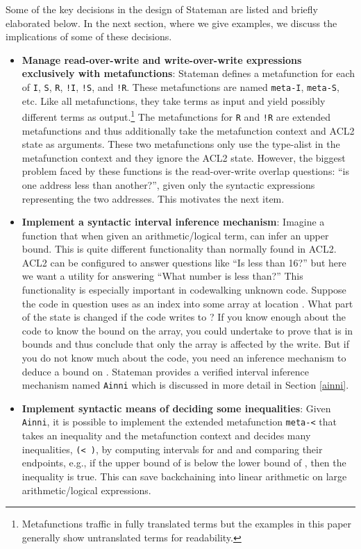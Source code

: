 \documentclass[submission,copyright,creativecommons]{eptcs}
\newcommand{\ptt}[1]{\tt{#1}}
\begin{document}
Some of the key decisions in the design of Stateman are listed and briefly
elaborated below.  In the next section, where we give examples, we discuss
the implications of some of these decisions.

\begin{itemize}

\item {\bf{Manage read-over-write and write-over-write expressions
    exclusively with metafunctions}}: Stateman defines a metafunction for
  each of {\ptt{I}}, {\ptt{S}}, {\ptt{R}}, {\ptt{!I}}, {\ptt{!S}}, and
  {\ptt{!R}}.  These metafunctions are named {\ptt{meta-I}}, {\ptt{meta-S}},
  etc.  Like all metafunctions, they take terms as input and yield possibly
  different terms as output.\footnote{Metafunctions traffic in fully
    translated terms but the examples in this paper generally show
    untranslated terms for readability.}  The metafunctions for {\ptt{R}} and
  {\ptt{!R}} are extended metafunctions and thus additionally take the
  metafunction context and ACL2 state as arguments.  These two metafunctions
  only use the type-alist in the metafunction context and they ignore the
  ACL2 state.  However, the biggest problem faced by these functions is the
  read-over-write overlap questions: ``is one address less than another?'', given
  only the syntactic expressions representing the two addresses.  This
  motivates the next item.

\item {\bf{Implement a syntactic interval inference mechanism}}: Imagine a
  function that when given an arithmetic/logical term, can infer an upper
  bound.  This is quite different functionality than normally found in ACL2.
  ACL2 can be configured to answer questions like ``Is  less than
  16?'' but here we want a utility for answering ``What number is 
  less than?''  This functionality is especially important in codewalking
  unknown code.  Suppose the code in question uses  as an index into
  some array at location .  What part of the state is changed if the
  code writes to ?  If you know enough about the code to know
  the bound on the array, you could undertake to prove that  is in
  bounds and thus conclude that only the array is affected by the write.  But
  if you do not know much about the code, you need an inference mechanism to
  deduce a bound on .  Stateman provides a verified interval
  inference mechanism named {\ptt{Ainni}} which is discussed in more detail
  in Section \ref{ainni}.

\item {\bf{Implement syntactic means of deciding some inequalities}}: Given
  {\ptt{Ainni}}, it is possible to implement the extended metafunction
  {\ptt{meta-<}} that takes an inequality and the metafunction context and
  decides many inequalities, {\ptt{(<  )}}, by computing
  intervals for  and  and comparing their endpoints, e.g., if
  the upper bound of  is below the lower bound of , then the
  inequality is true.  This can save backchaining into linear arithmetic on
  large arithmetic/logical expressions.


\end{itemize}
\end{document}
